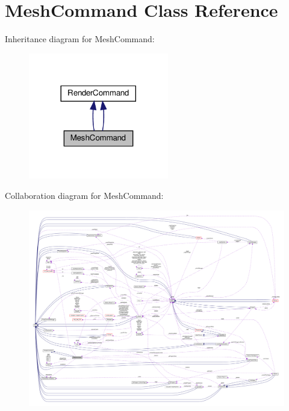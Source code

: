 \hypertarget{classMeshCommand}{}\section{Mesh\+Command Class Reference}
\label{classMeshCommand}


Inheritance diagram for Mesh\+Command\+:
\nopagebreak
\begin{figure}[H]
\begin{center}
\leavevmode
\includegraphics[width=173pt]{classMeshCommand__inherit__graph}
\end{center}
\end{figure}


Collaboration diagram for Mesh\+Command\+:
\nopagebreak
\begin{figure}[H]
\begin{center}
\leavevmode
\includegraphics[width=350pt]{classMeshCommand__coll__graph}
\end{center}
\end{figure}
